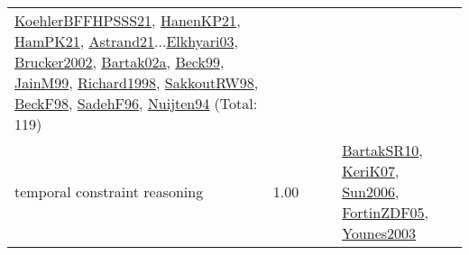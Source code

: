 {\begin{longtable}{p{3cm}r>{\raggedright\arraybackslash}p{6cm}>{\raggedright\arraybackslash}p{6cm}>{\raggedright\arraybackslash}p{8cm}}
\hyperref[detail:KoehlerBFFHPSSS21]{KoehlerBFFHPSSS21}, \hyperref[detail:HanenKP21]{HanenKP21}, \hyperref[detail:HamPK21]{HamPK21}, \hyperref[detail:Astrand21]{Astrand21}...\hyperref[detail:Elkhyari03]{Elkhyari03}, \hyperref[detail:Brucker2002]{Brucker2002}, \hyperref[detail:Bartak02a]{Bartak02a}, \hyperref[detail:Beck99]{Beck99}, \hyperref[detail:JainM99]{JainM99}, \hyperref[detail:Richard1998]{Richard1998}, \hyperref[detail:SakkoutRW98]{SakkoutRW98}, \hyperref[detail:BeckF98]{BeckF98}, \hyperref[detail:SadehF96]{SadehF96}, \hyperref[detail:Nuijten94]{Nuijten94} (Total: 119)\\
\index{temporal constraint reasoning}\index{Concepts!temporal constraint reasoning}temporal constraint reasoning &  1.00 &  &  & \hyperref[detail:BartakSR10]{BartakSR10}, \hyperref[detail:KeriK07]{KeriK07}, \hyperref[detail:Sun2006]{Sun2006}, \hyperref[detail:FortinZDF05]{FortinZDF05}, \hyperref[detail:Younes2003]{Younes2003}\\

\end{longtable}}
